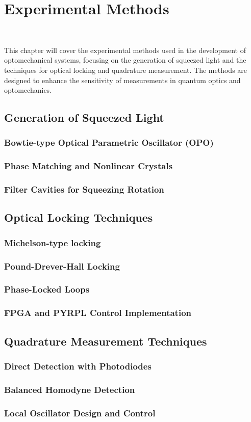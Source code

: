 \chapter{Experimental Methods}
\begingroup
{} %
\minitoc\
\endgroup 

This chapter will cover the experimental methods used in the development of optomechanical systems, focusing on the generation of squeezed light and the techniques for optical locking and quadrature measurement. The methods are designed to enhance the sensitivity of measurements in quantum optics and optomechanics.
\section{Generation of Squeezed Light}
\subsection{Bowtie-type Optical Parametric Oscillator (OPO)}
\subsection{Phase Matching and Nonlinear Crystals}
\subsection{Filter Cavities for Squeezing Rotation}
\section{Optical Locking Techniques}
\subsection{Michelson-type locking}
\subsection{Pound-Drever-Hall Locking}
\subsection{Phase-Locked Loops}
\subsection{FPGA and PYRPL Control Implementation}
\section{Quadrature Measurement Techniques}
\subsection{Direct Detection with Photodiodes}
\subsection{Balanced Homodyne Detection}
\subsection{Local Oscillator Design and Control}
